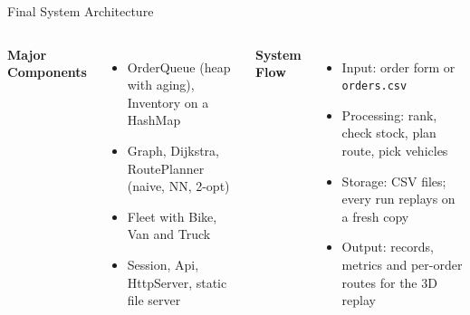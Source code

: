 \documentclass[aspectratio=169,11pt]{beamer}
\begin{document}
\begin{frame}{Final System Architecture}
\footnotesize
\begin{center}
\end{center}
\vspace{2mm}
\begin{columns}[T,totalwidth=\textwidth]
\textbf{\color{GEUBlue}Major Components}
\begin{itemize}\itemsep2pt
    \item OrderQueue (heap with aging), Inventory on a HashMap
    \item Graph, Dijkstra, RoutePlanner (naive, NN, 2-opt)
    \item Fleet with Bike, Van and Truck
    \item Session, Api, HttpServer, static file server
\end{itemize}
\textbf{\color{GEUBlue}System Flow}
\begin{itemize}\itemsep2pt
    \item Input: order form or \texttt{orders.csv}
    \item Processing: rank, check stock, plan route, pick vehicles
    \item Storage: CSV files; every run replays on a fresh copy
    \item Output: records, metrics and per-order routes for the 3D replay
\end{itemize}
\end{columns}
\vfill
\end{frame}
\end{document}
